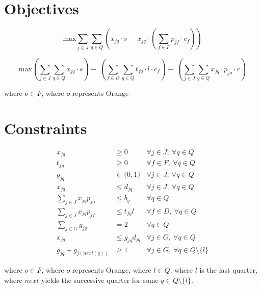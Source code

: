 \documentclass[a4paper]{article}
\newcommand{\SET}[1]{\{ {#1} \}}
\begin{document}
\section*{Objectives}

\[
\text{max} \sum_{j \in J}\sum_{q \in Q} \left(x_{jq} \cdot s -\: x_{jq} \cdot \left(\sum_{f \in F} p_{jf} \cdot c_f\right)\right)
\]

\[
\text{max} 
\left( \sum_{j \in J}\sum_{q \in Q} x_{jq} \cdot s \right) 
-\: 
\left( \sum_{f \in D}\sum_{q \in Q} t_{fq} \cdot l \cdot c_{f} \right) 
-\: 
\left( \sum_{j \in J}\sum_{q \in Q} x_{jq} \cdot p_{jo} \cdot r \right) 
\]

where $o \in F$, where $o$ represents Orange

\section*{Constraints}

\begin{align}
x_{jq} & \geq 0 & \forall j \in J,\  \forall q \in Q \label{C1}\\
t_{fq} & \geq 0 & \forall f \in F,\  \forall q \in Q \label{C2}\\
g_{jq} & \in \SET{0, 1} & \forall j \in J,\ \forall q \in Q \label{C3}\\
x_{jq} & \leq d_{jq} & \forall j \in J,\ \forall q \in Q \label{C4}\\
\sum_{j \in J} x_{jq} p_{jo} & \leq b_q & \forall q \in Q \label{C5}\\
\sum_{j \in J}  x_{jq} p_{jf} & \leq t_{fq} l & \forall f \in D,\ \forall q \in Q \label{C6}\\
\sum_{j \in G}  g_{jq} & = 2 & \forall q \in Q \label{C7}\\
x_{jq} & \leq g_{jq}d_{jq} & \forall j \in G,\ \forall q \in Q \label{C8}\\
g_{jq} + g_{j(next(q))} & \geq 1 & \forall j \in G,\ \forall q \in Q \setminus \SET{l}\label{C9}
\end{align}

where $o \in F$, where $o$ represents Orange, where $l \in Q$, where $l$ is the last quarter, where $next$ yields the successive quarter for some $q \in Q \setminus \SET{l}$.
\end{document}
